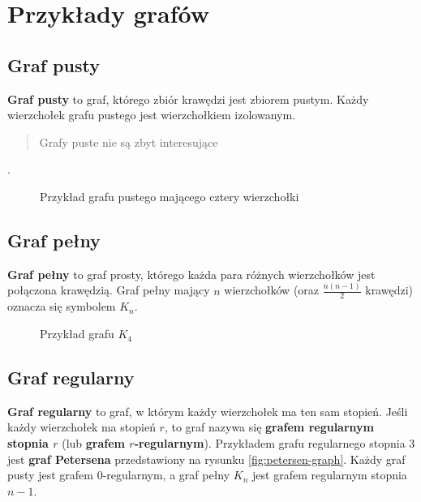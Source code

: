 \section{Przykłady grafów} \label{sec:common-graphs}

\subsection*{Graf pusty}

\textbf{Graf pusty} to graf, którego zbiór krawędzi jest zbiorem pustym. Każdy wierzchołek grafu pustego jest wierzchołkiem izolowanym. \blockquote{Grafy puste nie są zbyt interesujące}\cite[30]{wilson}.

\begin{figure}[h]
\centering
{}
\captionsetup{justification=centering}
\caption{Przykład grafu pustego mającego cztery wierzchołki} \label{fig:empty-graph-example}
\end{figure}

\subsection*{Graf pełny}

\textbf{Graf pełny} to graf prosty, którego każda para różnych wierzchołków jest połączona krawędzią. Graf pełny mający $n$ wierzchołków (oraz $\frac{n(n-1)}{2}$ krawędzi) oznacza się symbolem $K_n$. 

\begin{figure}[h]
\centering
{}
\captionsetup{justification=centering}
\caption{Przykład grafu $K_4$} \label{fig:complete-graph-example}
\end{figure}

\subsection*{Graf regularny}

\textbf{Graf regularny} to graf, w którym każdy wierzchołek ma ten sam stopień. Jeśli każdy wierzchołek ma stopień $r$, to graf nazywa się \textbf{grafem regularnym stopnia $r$} (lub \textbf{grafem $r$-regularnym})\cite[31]{wilson}. Przykładem grafu regularnego stopnia 3 jest \textbf{graf Petersena} przedstawiony na rysunku \ref{fig:petersen-graph}. Każdy graf pusty jest grafem $0$-regularnym, a graf pełny $K_n$ jest grafem regularnym stopnia $n-1$. 

